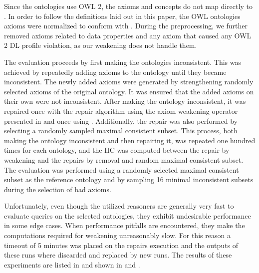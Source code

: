 \documentclass[
]{ceurart}
\begin{document}
Since the ontologies use OWL 2, the axioms and concepts do not map directly to \SROIQ. In order to follow the definitions laid out in this paper, the OWL ontologies axioms were normalized to conform with \SROIQ. During the preprocessing, we further removed axioms related to data properties and any axiom that caused any OWL 2 DL profile violation, as our weakening does not handle them.

The evaluation proceeds by first making the ontologies inconsistent. This was achieved by repeatedly adding axioms to the ontology until they became inconsistent. The newly added axioms were generated by strengthening randomly selected axioms of the original ontology. It was ensured that the added axioms on their own were not inconsistent. After making the ontology inconsistent, it was repaired once with the repair algorithm using the axiom weakening operator presented in  and once using . Additionally, the repair was also performed by selecting a randomly sampled maximal consistent subset. This process, both making the ontology inconsistent and then repairing it, was repeated one hundred times for each ontology, and the IIC was computed between the repair by weakening and the repairs by removal and random maximal consistent subset. The evaluation was performed using a randomly selected maximal consistent subset as the reference ontology and by sampling 16 minimal inconsistent subsets during the selection of bad axioms.

Unfortunately, even though the utilized reasoners are generally very fast to evaluate queries on the selected ontologies, they exhibit undesirable performance in some edge cases. When performance pitfalls are encountered, they make the computations required for weakening unreasonably slow. For this reason a timeout of 5 minutes was placed on the repairs execution and the outputs of these runs where discarded and replaced by new runs. The results of these experiments are listed in  and shown in  and .
\end{document}

